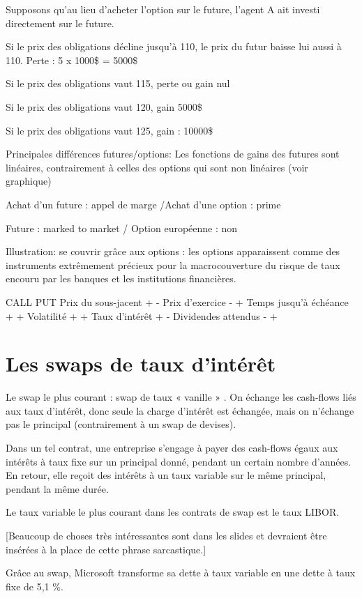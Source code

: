 Supposons qu'au lieu d'acheter l'option sur le future, l'agent A ait investi 
directement sur le future. 

Si le prix des obligations décline jusqu'à 110, le prix du futur baisse lui 
aussi à 110. Perte : 5 x 1000\$ = 5000\$ 

Si le prix des obligations vaut 115, perte ou gain nul 

Si le prix des obligations vaut 120, gain 5000\$ 

Si le prix des obligations vaut 125, gain : 10000\$

Principales différences futures/options: 
Les fonctions de gains des futures sont linéaires, contrairement à celles des 
options qui sont non linéaires (voir graphique) 

Achat d'un future : appel de marge /Achat d'une option : prime 

Future : marked to market / Option européenne : non

Illustration: se couvrir grâce aux options : les options apparaissent comme des instruments extrêmement précieux pour la macrocouverture du risque de taux encouru par les banques et les institutions financières.

CALL  PUT 
Prix du sous-jacent  +  - 
Prix d'exercice  -  + 
Temps jusqu'à échéance  +   +  
Volatilité  +  + 
Taux d'intérêt  +   - 
Dividendes attendus  -  + 

\section{Les swaps de taux d'intérêt}

Le swap le plus courant : swap de taux « vanille » . On échange les cash-flows liés aux taux d'intérêt, donc seule la charge d'intérêt est échangée, mais on n'échange pas le principal (contrairement à un swap de devises).

Dans un tel contrat, une entreprise s'engage à payer des cash-flows égaux aux intérêts à taux fixe sur un principal donné, pendant un certain nombre d'années. En retour, elle reçoit des intérêts à un taux variable sur le même principal, pendant la même durée. 

Le taux variable le plus courant dans les contrats de swap est le taux LIBOR. 

[Beaucoup de choses très intéressantes sont dans les slides et devraient être insérées à la place de cette phrase sarcastique.]

Grâce au swap, Microsoft transforme sa dette à taux variable en une dette à taux fixe de 5,1 \%.

